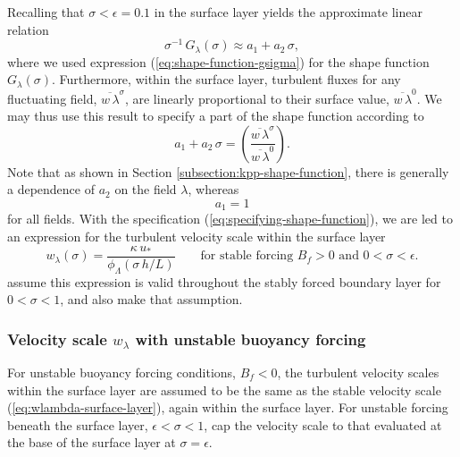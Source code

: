 Recalling that  $\sigma < \epsilon = 0.1$ in the surface
layer yields the approximate linear relation
\begin{equation}
\sigma^{-1} \, G_{\lambda}(\sigma)  \approx a_{1} + a_{2} \, \sigma,  
\end{equation}
where we used expression (\ref{eq:shape-function-gsigma}) for the
shape function $G_{\lambda}(\sigma)$.  Furthermore, within the surface
layer, turbulent fluxes for any fluctuating field, $\overline{w \,
  \lambda}^{\sigma}$, are linearly proportional to their surface
value, $\overline{w \, \lambda}^{0}$.  We may thus use this result to
specify a part of the shape function according to
\begin{equation}
  a_{1} + a_{2} \, \sigma = \left( \frac{ \overline{w \, \lambda}^{\sigma}}{\overline{w \, \lambda}^{0}} \right).
\label{eq:specifying-shape-function}
\end{equation}
Note that as shown in Section \ref{subsection:kpp-shape-function},
there is generally a dependence of $a_{2}$ on the field $\lambda$,
whereas 
\begin{equation}
 a_{1} = 1
\end{equation}
for all fields.  With the specification
(\ref{eq:specifying-shape-function}), we are led to an expression for
the turbulent velocity scale within the surface layer
\begin{equation}
  w_{\lambda}(\sigma)  = \frac{\kappa \,  u_{*}}{\phi_{\Lambda}(\sigma  \, h/L)}   
 \qquad \mbox{for stable forcing $B_{f} > 0$ and $0 < \sigma < \epsilon$.}
\label{eq:wlambda-surface-layer}
\end{equation}
\cite{Troen_Mahrt1986} assume this expression is valid throughout the
stably forced boundary layer for $0 < \sigma < 1$, and \cite{LargeKPP}
also make that assumption. 


\subsubsection{Velocity scale $w_{\lambda}$ with unstable buoyancy forcing}
\label{subsubsection:velocity-scale-unstable-bf}

For unstable buoyancy forcing conditions, $B_{f} < 0$, the turbulent
velocity scales within the surface layer are assumed to be the same as
the stable velocity scale (\ref{eq:wlambda-surface-layer}), again
within the surface layer.  For unstable forcing beneath the surface
layer, $\epsilon < \sigma < 1$, \cite{LargeKPP} cap the velocity scale
to that evaluated at the base of the surface layer at $\sigma =
\epsilon$.  

